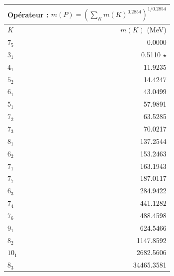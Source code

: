 \begin{center}
\renewcommand{\arraystretch}{1.1}
\begin{tabular}{lr}
\toprule
\multicolumn{2}{c}{Opérateur : $m(P) = \left(\sum_K m(K)^{0.2854}\right)^{1/0.2854}$} \\
\midrule
$K$ & $m(K)$ (MeV) \\
\midrule
  $7_5$ & 0.0000 \\
  $3_1$ & 0.5110 $\star$ \\
  $4_1$ & 11.9235 \\
  $5_2$ & 14.4247 \\
  $6_1$ & 43.0499 \\
  $5_1$ & 57.9891 \\
  $7_2$ & 63.5285 \\
  $7_3$ & 70.0217 \\
  $8_1$ & 137.2544 \\
  $6_2$ & 153.2463 \\
  $7_1$ & 163.1943 \\
  $7_7$ & 187.0117 \\
  $6_3$ & 284.9422 \\
  $7_4$ & 441.1282 \\
  $7_6$ & 488.4598 \\
  $9_1$ & 624.5466 \\
  $8_2$ & 1147.8592 \\
  $10_1$ & 2682.5606 \\
  $8_3$ & 34465.3581 \\
\bottomrule
\end{tabular}
\end{center}

